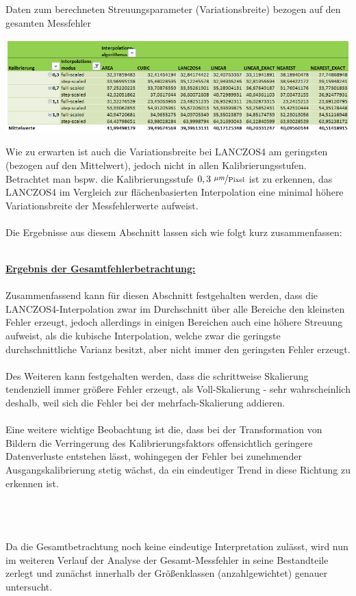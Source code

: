 \documentclass[
fontsize=10pt, 
listof = totoc,
parskip = half	
]{report}
\begin{document}
\begin{table}[H]
	\centering
	\caption{Daten zum berechneten Streuungsparameter (Variationsbreite) bezogen auf den gesamten Messfehler}
	\label{tab:DAGesamtStreu2Alle}
	\includegraphics[width=\textwidth, height=\textheight, keepaspectratio]{pics/Tab_DA_Gesamt_Streu2_Alle}
\end{table}


\noindent Wie zu erwarten ist auch die Variationsbreite bei LANCZOS4 am geringsten (bezogen auf den Mittelwert), jedoch nicht in allen Kalibrierungsstufen. Betrachtet man bspw. die Kalibrierungsstufe $0,3~\nicefrac{\mu m}{\text{Pixel}}$ ist zu erkennen, das LANCZOS4 im Vergleich zur flächenbasierten Interpolation eine minimal höhere Variationsbreite der Messfehlerwerte aufweist. 
\\\\
Die Ergebnisse aus diesem Abschnitt lassen sich wie folgt kurz zusammenfassen:
\\\\
\colorbox{gray!10}{
	\label{box:ErgebnisGesamtauswertung}
	\begin{minipage}{0.975\textwidth}
		\textbf{\underline{Ergebnis der Gesamtfehlerbetrachtung:}}\\\\
		Zusammenfassend kann für diesen Abschnitt festgehalten werden, dass die LANCZOS4-Interpolation zwar im Durchschnitt über alle Bereiche den kleinsten Fehler erzeugt, jedoch allerdings in einigen Bereichen auch eine höhere Streuung aufweist, als die kubische Interpolation, welche zwar die geringste durchschnittliche Varianz besitzt, aber nicht immer den geringsten Fehler erzeugt.
		\\\\
		\noindent Des Weiteren kann festgehalten werden, dass die schrittweise Skalierung tendenziell immer größere Fehler erzeugt, als Voll-Skalierung - sehr wahrscheinlich deshalb, weil sich die Fehler bei der mehrfach-Skalierung addieren. 
		\\\\
		\noindent Eine weitere wichtige Beobachtung ist die, dass bei der Transformation von Bildern die Verringerung des Kalibrierungsfaktors offensichtlich geringere Datenverluste entstehen lässt, wohingegen der Fehler bei zunehmender Ausgangskalibrierung stetig wächst, da ein eindeutiger Trend in diese Richtung zu erkennen ist.
	\end{minipage}
}
\\\\\\
Da die Gesamtbetrachtung noch keine eindeutige Interpretation zulässt, wird nun im weiteren Verlauf der Analyse der Gesamt-Messfehler in seine Bestandteile zerlegt und zunächst innerhalb der Größenklassen (anzahlgewichtet) genauer untersucht.
\end{document}
